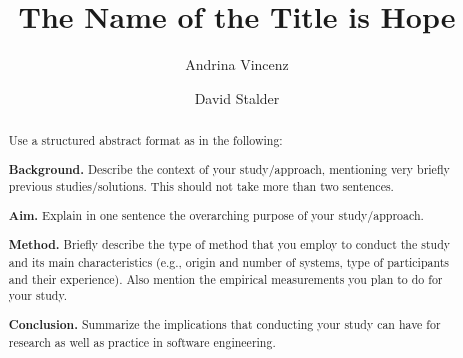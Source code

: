 \documentclass[sigconf,screen]{acmart}
\begin{document}
\title{The Name of the Title is Hope}

\author{Andrina Vincenz}

\author{David Stalder}


\renewcommand{\shortauthors}{Trovato, Tobin, B\'eranger}

\begin{abstract}
  Use a structured abstract format as in the following:

\textbf{Background.} Describe the context of your study/approach, mentioning very briefly previous studies/solutions. This should not take more than two sentences.

\textbf{Aim.} Explain in one sentence the overarching purpose of your study/approach.

\textbf{Method.} Briefly describe the type of method that you employ to conduct the study and its main characteristics (e.g., origin and number of systems, type of participants and their experience). Also mention the empirical measurements you plan to do for your study.

\textbf{Conclusion.} Summarize the implications that conducting your study can have for research as well as practice in software engineering.
\end{abstract}



\maketitle
\end{document}
